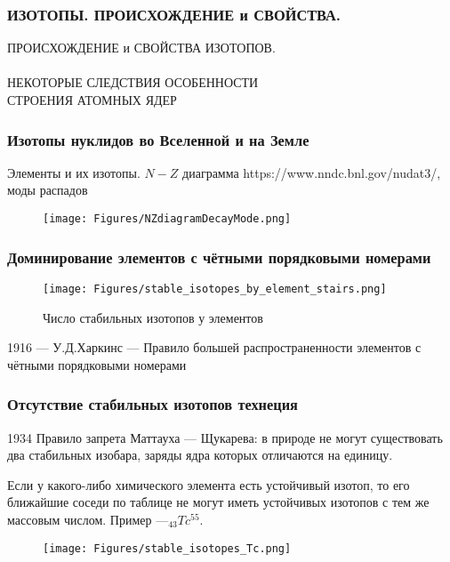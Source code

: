 \begin{frame}
\frametitle{ИЗОТОПЫ. ПРОИСХОЖДЕНИЕ и СВОЙСТВА.}

\begin{center}
ПРОИСХОЖДЕНИЕ и СВОЙСТВА ИЗОТОПОВ.\\
~\\
	НЕКОТОРЫЕ СЛЕДСТВИЯ ОСОБЕННОСТИ \\ СТРОЕНИЯ АТОМНЫХ ЯДЕР
\end{center}

\end{frame}

\begin{frame}
	\frametitle{Изотопы нуклидов во Вселенной и на Земле}
Элементы и их изотопы.	$N\!-\!Z$ диаграмма %
https://www.nndc.bnl.gov/nudat3/, моды распадов
\begin{figure}[ht] 
	\centering\small
	\unitlength=1mm
	\texttt{[image: Figures/NZdiagramDecayMode.png]} 
	\label{f:NZdiagram}
\end{figure}	

\end{frame}

\begin{frame}
\frametitle{Доминирование элементов с чётными порядковыми номерами}

\begin{figure}[ht] 
	\centering\small
	\unitlength=1mm
	\texttt{[image: Figures/stable\_isotopes\_by\_element\_stairs.png]} 
	\caption{Число стабильных изотопов у элементов} 
	\label{f:stable_isotopes_by_element}
\end{figure}	
	1916 --- У.Д.Харкинс --- {\color{red}Правило большей распространенности элементов с чётными порядковыми номерами} 
\end{frame}

\begin{frame}
\frametitle{Отсутствие стабильных изотопов технеция}

1934 Правило запрета Маттауха — Щукарева: {\color{red}в природе не могут существовать два стабильных изобара, заряды ядра которых отличаются на единицу. }

Если у какого-либо химического элемента есть устойчивый изотоп, то его ближайшие соседи по таблице не могут иметь устойчивых изотопов с тем же массовым числом.  
Пример ---$_{43}Tc^{55}$.
\begin{figure}[ht] 
	\centering\small
	\unitlength=1mm
	\texttt{[image: Figures/stable\_isotopes\_Tc.png]} 
	\label{f:stable_isotopes_by_elementTc}
\end{figure}	


 
\end{frame}

